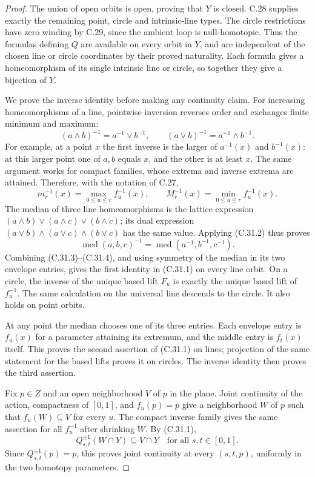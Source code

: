 \begin{proof}
The union of open orbits is open, proving that $Y$ is closed.
C.28 supplies exactly the remaining point, circle and intrinsic-line
types. The circle restrictions have zero winding by C.29, since
the ambient loop is null-homotopic. Thus the formulas defining $Q$
are available on every orbit in $Y$, and are independent of the
chosen line or circle coordinates by their proved naturality.
Each formula gives a homeomorphism of its single intrinsic line
or circle, so together they give a bijection of $Y$.

We prove the inverse identity before making any continuity claim.
For increasing homeomorphisms of a line, pointwise inversion
reverses order and exchanges finite minimum and maximum:
\[
 (a\wedge b)^{-1}=a^{-1}\vee b^{-1},\qquad
 (a\vee b)^{-1}=a^{-1}\wedge b^{-1}.
                                                        \tag{C.31.2}
\]
For example, at a point $x$ the first inverse is the larger of
$a^{-1}(x)$ and $b^{-1}(x)$: at this larger point one of $a,b$
equals $x$, and the other is at least $x$.
The same argument works for compact families, whose extrema
and inverse extrema are attained. Therefore, with the notation
of C.27,
\[
 m_r^{-1}(x)=\max_{0\leq u\leq r} f_u^{-1}(x),\qquad
 M_r^{-1}(x)=\min_{0\leq u\leq r} f_u^{-1}(x).
                                                        \tag{C.31.3}
\]
The median of three line homeomorphisms is the lattice expression
$(a\wedge b)\vee(a\wedge c)\vee(b\wedge c)$; its dual expression
$(a\vee b)\wedge(a\vee c)\wedge(b\vee c)$ has the same value.
Applying (C.31.2) thus proves
\[
 \operatorname{med}(a,b,c)^{-1}
       =\operatorname{med}(a^{-1},b^{-1},c^{-1}).
                                                        \tag{C.31.4}
\]
Combining (C.31.3)--(C.31.4), and using symmetry of the median
in its two envelope entries, gives the first identity in (C.31.1)
on every line orbit. On a circle, the inverse of the unique based
lift $F_u$ is exactly the unique based lift of $f_u^{-1}$.
The same calculation on the universal line descends to the circle.
It also holds on point orbits.

At any point the median chooses one of its three entries. Each
envelope entry is $f_u(x)$ for a parameter attaining its extremum,
and the middle entry is $f_t(x)$ itself. This proves the second
assertion of (C.31.1) on lines; projection of the same statement
for the based lifts proves it on circles. The inverse identity
then proves the third assertion.

Fix $p\in Z$ and an open neighborhood $V$ of $p$ in the plane.
Joint continuity of the action, compactness of $[0,1]$, and
$f_u(p)=p$ give a neighborhood $W$ of $p$ such that
$f_u(W)\subseteq V$ for every $u$. The compact inverse family
gives the same assertion for all $f_u^{-1}$ after shrinking $W$.
By (C.31.1),
\[
 Q_{s,t}^{\pm1}(W\cap Y)\subseteq V\cap Y
                   \quad\text{for all }s,t\in[0,1].       \tag{C.31.5}
\]
Since $Q_{s,t}^{\pm1}(p)=p$, this proves joint continuity at every
$(s,t,p)$, uniformly in the two homotopy parameters.


\end{proof}
